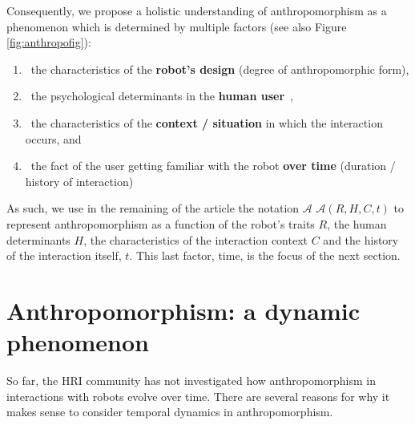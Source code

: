 \documentclass{frontiersSCNS} %
\newcommand{\Ant}[1][]{%
      \ifthenelse{\isempty{#1}}%
        {$\mathcal{A}$}
        {$\mathcal{A}(#1)$}
}
\begin{document}
Consequently, we propose a holistic understanding of anthropomorphism as a
phenomenon which is determined by multiple factors (see also Figure
\ref{fig:anthropofig}):

\begin{enumerate}

\item ~the characteristics of the \textbf{robot's design} (degree of
    anthropomorphic form),

\item ~the psychological determinants in the \textbf{human
    user}~\citep{epley_seeing_2007},

\item ~the characteristics of the \textbf{context / situation} in which the
    interaction occurs, and

\item ~the fact of the user getting familiar with the robot \textbf{over time}
    (duration / history of interaction)

\end{enumerate}

As such, we use in the remaining of the article the notation \Ant[R,H,C,t] to
represent anthropomorphism as a function of the robot's traits $R$, the human
determinants $H$, the characteristics of the interaction context $C$ and the
history of the interaction itself, $t$. This last factor, time, is the focus of
the next section.

%
%
%
%
%
%

\section{Anthropomorphism: a dynamic phenomenon}
\label{sec:our-ideas}

So far, the HRI community has not investigated how anthropomorphism in
interactions with robots evolve over time. There are several reasons for why it
makes sense to consider temporal dynamics in anthropomorphism.
\end{document}
